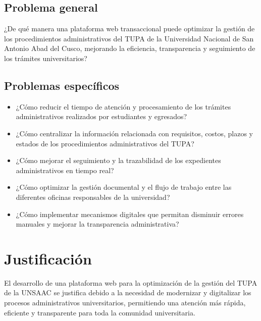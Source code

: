 \subsection{Problema general}

¿De qué manera una plataforma web transaccional puede optimizar la gestión de los procedimientos administrativos del TUPA de la Universidad Nacional de San Antonio Abad del Cusco, mejorando la eficiencia, transparencia y seguimiento de los trámites universitarios?

\subsection{Problemas específicos}

\begin{itemize}
    \item ¿Cómo reducir el tiempo de atención y procesamiento de los trámites administrativos realizados por estudiantes y egresados?
    
    \item ¿Cómo centralizar la información relacionada con requisitos, costos, plazos y estados de los procedimientos administrativos del TUPA?
    
    \item ¿Cómo mejorar el seguimiento y la trazabilidad de los expedientes administrativos en tiempo real?
    
    \item ¿Cómo optimizar la gestión documental y el flujo de trabajo entre las diferentes oficinas responsables de la universidad?
    
    \item ¿Cómo implementar mecanismos digitales que permitan disminuir errores manuales y mejorar la transparencia administrativa?
\end{itemize}

\section{Justificación}

El desarrollo de una plataforma web para la optimización de la gestión del TUPA de la UNSAAC se justifica debido a la necesidad de modernizar y digitalizar los procesos administrativos universitarios, permitiendo una atención más rápida, eficiente y transparente para toda la comunidad universitaria.

\vspace{0.3cm}

